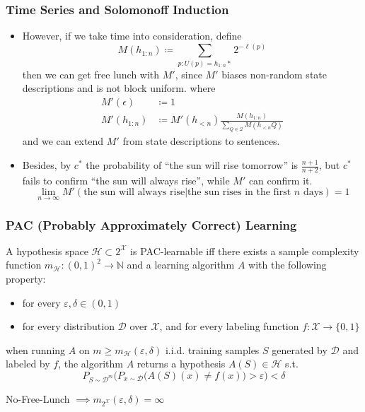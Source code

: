 \documentclass[UTF8,11pt,colorlinks,compress,openany]{beamer}%
\begin{document}
\begin{frame}\frametitle{Time Series and Solomonoff Induction}
	\begin{itemize}
		\item However, if we take time into consideration, define
		\[M(h_{1:n})\coloneqq \sum\limits_{p:U(p)=h_{1:n}*}2^{-\ell(p)}\]
		then we can get free lunch with $M'$, since $M'$ biases non-random state descriptions and is not block uniform.
		where 
		\begin{align*}
		M'(\epsilon)&\coloneqq 1\\
		M'(h_{1:n})&\coloneqq M'(h_{<n})\frac{M(h_{1:n})}{\sum\limits_{Q\in\mathcal{Q}}M(h_{<n}Q)}
		\end{align*}
		and we can extend $M'$ from state descriptions to sentences.
		\item Besides, by $c^*$ the probability of ``the sun will rise tomorrow'' is $\frac{n+1}{n+2}$, but $c^*$ fails to confirm ``the sun will always rise'', while $M'$ can confirm it.
		\[\lim\limits_{n\to\infty}M'(\text{the sun will always rise}|\text{the sun rises in the first $n$ days})=1\]
	\end{itemize}
\end{frame}

\begin{frame}\frametitle{PAC (Probably Approximately Correct) Learning}
\setlength\abovedisplayskip{0pt}
\setlength\belowdisplayskip{0pt}
	\begin{definition}
		A hypothesis space $\mathcal{H}\subset 2^{\mathcal{X}}$ is PAC-learnable iff there exists a sample complexity function $m_{\mathcal{H}}: (0,1)^2\to\mathbb{N}$ and a learning algorithm $A$ with the following property:
		\begin{itemize}
			\item for every $\varepsilon,\delta\in(0,1)$
			\item for every distribution $\mathcal{D}$ over $\mathcal{X}$, and for every labeling function $f:\mathcal{X}\to\{0,1\}$
		\end{itemize}
		when running $A$ on $m\geq m_{\mathcal{H}}(\varepsilon,\delta)$ i.i.d. training samples $S$ generated by $\mathcal{D}$ and labeled by $f$, the algorithm $A$ returns a hypothesis $A(S)\in\mathcal{H}$ s.t.
		\[P_{S\sim\mathcal{D}^m}\Big(P_{x\sim\mathcal{D}}\big(A(S)(x)\neq f(x)\big)>\varepsilon\Big)<\delta\]
	\end{definition}
	\centering No-Free-Lunch $\implies m_{2^{\mathcal{X}}}(\varepsilon,\delta)=\infty$
\end{frame}
\end{document}
